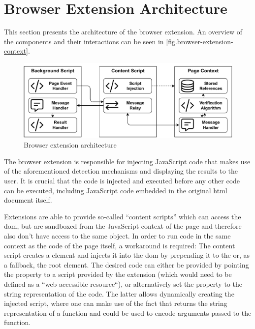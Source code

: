 \filbreak{}

\section{Browser Extension Architecture}
\label{sec.browserExtensionArchitecture}

This section presents the architecture of the browser extension. An overview of the components and their interactions can be seen in \autoref{fig.browser-extension-context}.

\begin{figure}[H]
    \centering
    \includegraphics[width=16cm]{img/context-diagram.pdf}
    \caption{Browser extension architecture}
    \label{fig.browser-extension-context}
\end{figure}

The browser extension is responsible for injecting JavaScript code that makes use of the aforementioned detection mechanisms and displaying the results to the user. It is crucial that the code is injected and executed before any other code can be executed, including JavaScript code embedded in the original \acs{html} document itself.

Extensions are able to provide so-called “content scripts” which can access the \ac{dom}, but are sandboxed from the JavaScript context of the page and therefore also don't have access to the same  object. In order to run code in the same context as the code of the page itself, a workaround is required: The content script creates a  element and injects it into the \ac{dom} by prepending it to the  or, as a fallback, the root  element.
The desired code can either be provided by pointing the  property to a script provided by the extension (which would need to be defined as a “web accessible resource“), or alternatively set the  property to the string representation of the code. The latter allows dynamically creating the injected script, where one can make use of the fact that  returns the string representation of a function and  could be used to encode arguments passed to the function.


